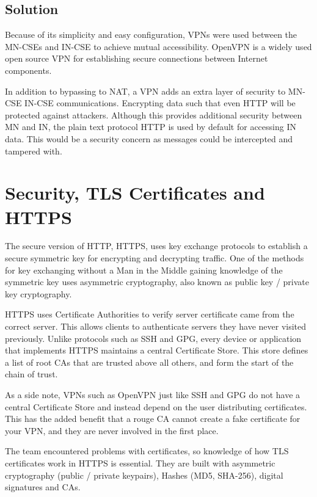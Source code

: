 \subsection{Solution}

Because of its simplicity and easy configuration, VPNs were used between the MN-CSEs and IN-CSE to achieve mutual accessibility. OpenVPN \cite{OpenVPN2018OpenVPNVPN} is a widely used open source VPN for establishing secure connections between Internet components.

In addition to bypassing to NAT, a VPN adds an extra layer of security to MN-CSE IN-CSE communications. Encrypting data such that even HTTP will be protected against attackers. Although this provides additional security between MN and IN, the plain text protocol HTTP is used by default for accessing IN data. This would be a security concern as messages could be intercepted and tampered with.    

\section{Security, TLS Certificates and HTTPS}

The secure version of HTTP, HTTPS, uses key exchange protocols to establish a secure symmetric key for encrypting and decrypting traffic. One of the methods for key exchanging without a Man in the Middle gaining knowledge of the symmetric key uses asymmetric cryptography, also known as public key / private key cryptography. 

HTTPS uses Certificate Authorities to verify server certificate came from the correct server. This allows clients to authenticate servers they have never visited previously. Unlike protocols such as SSH and GPG, every device or application that implements HTTPS maintains a central Certificate Store. This store defines a list of root CAs that are trusted above all others, and form the start of the chain of trust.

As a side note, VPNs such as OpenVPN just like SSH and GPG do not have a central Certificate Store and instead depend on the user distributing certificates. This has the added benefit that a rouge CA cannot create a fake certificate for your VPN, and they are never involved in the first place. 

The team encountered problems with certificates, so knowledge of how TLS certificates work in HTTPS is essential. They are built with asymmetric cryptography (public / private keypairs), Hashes (MD5, SHA-256), digital signatures and CAs. 

